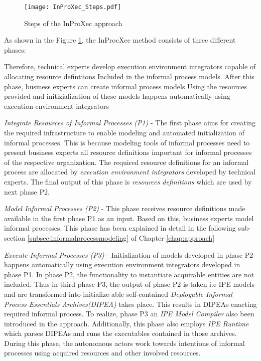 \begin{figure}
	\centering
	\texttt{[image: InProXec\_Steps.pdf]}
	\caption{Steps of the InProXec approach \cite{Sungur2015}}
	\label{fig:inprocxec_steps}
\end{figure} 

As shown in the Figure \ref{fig:inprocxec_steps}, the InProcXec method consists of three different phases:


Therefore, technical experts develop execution environment integrators  capable of allocating resource defintiions
Included in the informal process models. After this phase, business experts can create informal process models 
Using the resources provided and initizialization of these models happens automatically using execution environment integrators


\textit{Integrate Resources of Informal Processes (P1)} - The first phase aims for creating the required infrastructure to enable modeling and automated initialization of informal processes. This is because modeling tools of informal processes need to present business experts  all
resource definitions important for informal processes of the respective organization. The required resource definitions for an informal process are allocated by \textit{execution environment integrators} developed by technical experts. The final output of this phase is \textit{resources definitions} which are used by next phase P2. 

\textit{Model Informal Processes (P2)} - This phase receives resource definitions made available in the first phase P1 as an input.  Based on this, business experts model informal processes. This phase has been explained in detail in the following sub-section \ref{subsec:informalprocessmodeling} of Chapter \ref{chap:approach}

\textit{Execute Informal Processes (P3)} - Initialization of models developed in phase P2 happens automatically using execution environment integrators developed in phase P1. In phase P2, the functionality to instantiate acquirable entities are not included. Thus in third phase P3, the output of phase P2 is taken i.e IPE models and are transformed into initialize-able self-contained \textit{Deployable Informal Process Essentials Archives(DIPEA)} \cite{Sungur2015} takes place. This results in DIPEAs enacting required informal process. To realize, phase P3 an \textit{IPE Model Compiler} also been introduced in the approach. Additionally, this phase also employs \textit{IPE Runtime} which parses DIPEAs and runs the executables contained in those archives. During this phase, the autonomous actors work towards intentions of informal processes using acquired resources and other involved resources.  











